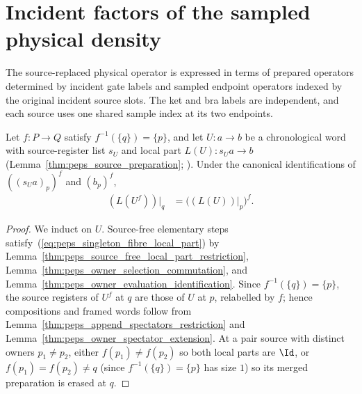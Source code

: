 \section{Incident factors of the sampled physical density}
\label{sec:peps_incident_sampled_physical_density}

The source-replaced physical operator is expressed in terms of prepared
operators determined by incident gate labels and sampled endpoint operators
indexed by the original incident source slots. The ket and bra labels are
independent, and each source uses one shared sample index at its two endpoints.

\begin{lemma}
    \label{thm:peps_singleton_fibre_local_part}
    \leanok
    Let $f:P\to Q$ satisfy $f^{-1}(\{q\})=\{p\}$, and let $U:a\to b$ be a
    chronological word with source-register list $s_U$ and local part
    $L(U):s_Ua\to b$ (Lemma~\ref{thm:peps_source_preparation};
    \cite[proof of Theorem~5.2]{OpenAI2026PolynomialPEPS}). Under the canonical
    identifications of $((s_Ua)_p)^f$ and $(b_p)^f$,
    \begin{align}
        (L(U^f))|_q & =\bigl((L(U))|_p\bigr)^f.
        \label{eq:peps_singleton_fibre_local_part}
    \end{align}
\end{lemma}

\begin{proof}
    \leanok
    We induct on $U$. Source-free elementary steps satisfy~(\ref{eq:peps_singleton_fibre_local_part})
    by Lemma~\ref{thm:peps_source_free_local_part_restriction},
    Lemma~\ref{thm:peps_owner_selection_commutation}, and
    Lemma~\ref{thm:peps_owner_evaluation_identification}. Since
    $f^{-1}(\{q\})=\{p\}$, the source registers of $U^f$ at $q$ are those of
    $U$ at $p$, relabelled by $f$; hence compositions and framed words follow
    from Lemma~\ref{thm:peps_append_spectators_restriction} and
    Lemma~\ref{thm:peps_owner_spectator_extension}. At a pair source with
    distinct owners $p_1\ne p_2$, either $f(p_1)\ne f(p_2)$ so both local parts
    are $\Id$, or $f(p_1)=f(p_2)\ne q$ (since $f^{-1}(\{q\})=\{p\}$ has size
    $1$) so its merged preparation is erased at $q$.
\end{proof}

